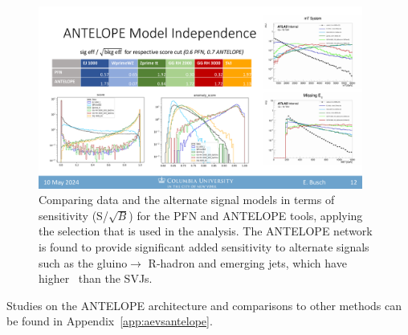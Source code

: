\begin{figure}[!htbp]
\centering
   \includegraphics[width=0.95\textwidth]{figures/ml/antelope_pfn_comp}
    \caption{Comparing data and the alternate signal models in terms of sensitivity (S/$\sqrt{B}$) for the PFN and ANTELOPE tools, applying the selection that is used in the analysis. The ANTELOPE network is found to provide significant added sensitivity to alternate signals such as the gluino$\rightarrow$ R-hadron and emerging jets, which have higher \met~than the SVJs.
    \label{fig:antelope_pfn_comp}}
\end{figure}


Studies on the ANTELOPE architecture and comparisons to other methods can be found in Appendix~\ref{app:aevsantelope}.






